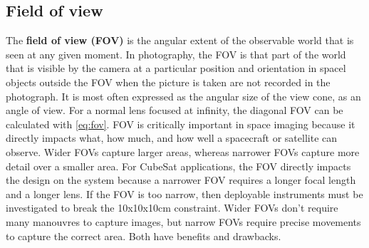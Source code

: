 \documentclass[10pt]{article}
\begin{document}
\begin{multicols}{2}
\subsection{Field of view}
The \textbf{field of view (FOV)} is the angular extent of the observable world that is seen at any given moment. In photography, the FOV is that part of the world that is visible by the camera at a particular position and orientation in spacel objects outside the FOV when the picture is taken are not recorded in the photograph. It is most often expressed as the angular size of the view cone, as an angle of view. For a normal lens focused at infinity, the diagonal FOV can be calculated with \ref{eq:fov}.
\newline \newline
FOV is critically important in space imaging because it directly impacts what, how much, and how well a spacecraft or satellite can observe. Wider FOVs capture larger areas, whereas narrower FOVs capture more detail over a smaller area. For CubeSat applications, the FOV directly impacts the design on the system because a narrower FOV requires a longer focal length and a longer lens. If the FOV is too narrow, then deployable instruments must be investigated to break the 10x10x10cm constraint.
Wider FOVs don't require many manouvres to capture images, but narrow FOVs require precise movements to capture the correct area. Both have benefits and drawbacks.


\end{multicols}
\end{document}
